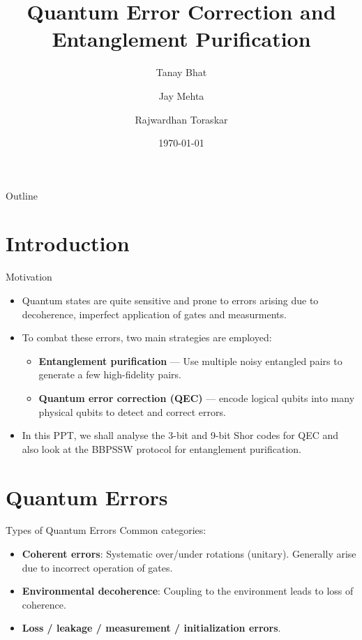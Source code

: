 \documentclass[10pt]{beamer}
\title[Quantum Error Correction]{Quantum Error Correction and Entanglement Purification}
\author[Tanay, Jay, Rajwardhan]{Tanay Bhat \and Jay Mehta \and Rajwardhan Toraskar}
\institute[IIT Bombay]{Department of Electrical Engineering\\Indian Institute of Technology, Bombay}
\date{\today}
\begin{document}
\begin{frame}
  \titlepage
  \vfill
  \centering
\end{frame}

\begin{frame}{Outline}
  \tableofcontents
\end{frame}

\section{Introduction}
\begin{frame}{Motivation}
  \begin{itemize}
    \item Quantum states are quite sensitive and prone to errors arising due to decoherence, imperfect application of gates and measurments.
    \item To combat these errors, two main strategies are employed:
      \begin{itemize}
        \item \textbf{Entanglement purification} — Use multiple noisy entangled pairs to generate a few high-fidelity pairs.
        \item \textbf{Quantum error correction (QEC)} — encode logical qubits into many physical qubits to detect and correct errors.
      \end{itemize}
    \item In this PPT, we shall analyse the 3-bit and 9-bit Shor codes for QEC and also look at the BBPSSW protocol for entanglement purification.
  \end{itemize}
\end{frame}

\section{Quantum Errors}
\begin{frame}{Types of Quantum Errors}
  Common categories:
  \begin{itemize}
    \item \textbf{Coherent errors}: Systematic over/under rotations (unitary). Generally arise due to incorrect operation of gates.
    \item \textbf{Environmental decoherence}: Coupling to the environment leads to loss of coherence.
    \item \textbf{Loss / leakage / measurement / initialization errors}.
  \end{itemize}
\end{frame}
\end{document}
